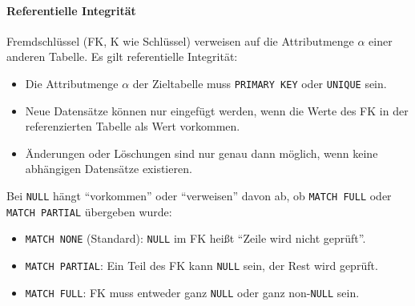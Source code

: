 \documentclass[a4paper, 11pt, accentcolor = tud3b]{tudreport}
\begin{document}
                	\paragraph{Referentielle Integrität}
                		Fremdschlüssel (FK, K wie Schlüssel) verweisen auf die Attributmenge \( \alpha \) einer anderen Tabelle. Es gilt referentielle Integrität:
                		\begin{itemize}
                			\item Die Attributmenge \(\alpha\) der Zieltabelle muss \lstinline|PRIMARY KEY| oder \lstinline|UNIQUE| sein.
                			\item Neue Datensätze können nur eingefügt werden, wenn die Werte des FK in der referenzierten Tabelle als Wert vorkommen.
                			\item Änderungen oder Löschungen sind nur genau dann möglich, wenn keine abhängigen Datensätze existieren.
                		\end{itemize}
                	
                		Bei \lstinline|NULL| hängt \enquote{vorkommen} oder \enquote{verweisen} davon ab, ob \lstinline|MATCH FULL| oder \lstinline|MATCH PARTIAL| übergeben wurde:
                		\begin{itemize}
                			\item \lstinline|MATCH NONE| (Standard): \lstinline|NULL| im FK heißt \enquote{Zeile wird nicht geprüft}.
                			\item \lstinline|MATCH PARTIAL|: Ein Teil des FK kann \lstinline|NULL| sein, der Rest wird geprüft.
                			\item \lstinline|MATCH FULL|: FK muss entweder ganz \lstinline|NULL| oder ganz non-\lstinline|NULL| sein.
                		\end{itemize}
                	
\end{document}
